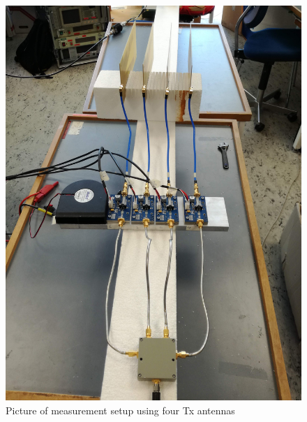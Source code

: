 \begin{figure}[H]
\centering 
\includegraphics[scale = 0.06]{figures/measurement/cree/meas4/meas4.jpg}
\caption{Picture of measurement setup using four Tx antennas}
\label{fig:meas_amp4}
\end{figure}

